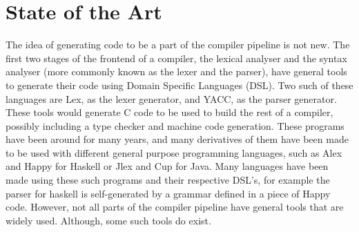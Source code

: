 \chapter{State of the Art}

The idea of generating code to be a part of the compiler pipeline is not new.
The first two stages of the frontend of a compiler, the lexical analyser and the syntax analyser (more commonly known as the lexer and the parser), have general tools to generate their code using Domain Specific Languages (DSL)\cite{Bentley:1986:PPL:6424.315691,van2000domain}.
Two such of these languages are Lex, as the lexer generator, and YACC, as the parser generator.
These tools would generate C code to be used to build the rest of a compiler, possibly including a type checker and machine code generation.
These programs have been around for many years, and many derivatives of them have been made to be used with different general purpose programming languages, such as Alex and Happy for Haskell or Jlex and Cup for Java\cite{ranta2012implementing}.
Many languages have been made using these such programs and their respective DSL's, for example the parser for haskell is self-generated by a grammar defined in a piece of Happy code.
However, not all parts of the compiler pipeline have general tools that are widely used.
Although, some such tools do exist\cite{grimm2007typical,ruler:10.1007/11737414_4}.


